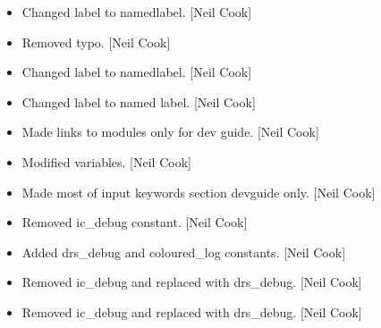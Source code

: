 \documentclass[a4paper,10pt,english]{report}
\begin{document}
\begin{itemize}
\item {} 
Changed label to namedlabel. {[}Neil Cook{]}

\item {} 
Removed typo. {[}Neil Cook{]}

\item {} 
Changed label to namedlabel. {[}Neil Cook{]}

\item {} 
Changed label to named label. {[}Neil Cook{]}

\item {} 
Made links to modules only for dev guide. {[}Neil Cook{]}

\item {} 
Modified variables. {[}Neil Cook{]}

\item {} 
Made most of input keywords section devguide only. {[}Neil Cook{]}

\item {} 
Removed ic\_debug constant. {[}Neil Cook{]}

\item {} 
Added drs\_debug and coloured\_log constants. {[}Neil Cook{]}

\item {} 
Removed ic\_debug and replaced with drs\_debug. {[}Neil Cook{]}

\item {} 
Removed ic\_debug and replaced with drs\_debug. {[}Neil Cook{]}

\end{itemize}
\end{document}
